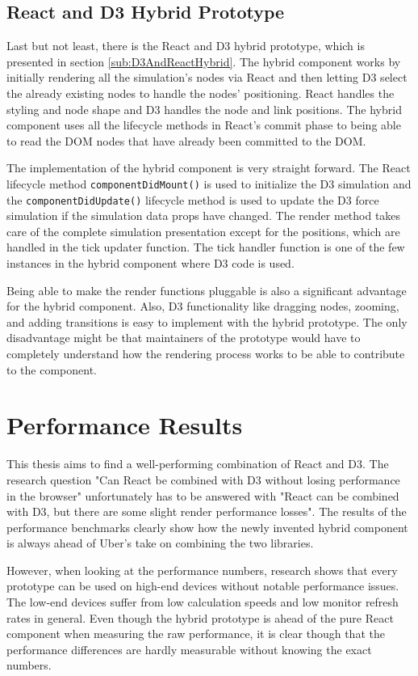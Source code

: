 \subsection{React and D3 Hybrid Prototype}

Last but not least, there is the React and D3 hybrid prototype, which is presented in section \ref{sub:D3AndReactHybrid}. The hybrid component works by initially rendering all the simulation's nodes via React and then letting D3 select the already existing nodes to handle the nodes' positioning. React handles the styling and node shape and D3 handles the node and link positions. The hybrid component uses all the lifecycle methods in React's commit phase to being able to read the DOM nodes that have already been committed to the DOM. 

The implementation of the hybrid component is very straight forward. The React lifecycle method \texttt{componentDidMount()} is used to initialize the D3 simulation and the \texttt{componentDidUpdate()} lifecycle method is used to update the D3 force simulation if the simulation data props have changed. The render method takes care of the complete simulation presentation except for the positions, which are handled in the tick updater function. The tick handler function is one of the few instances in the hybrid component where D3 code is used.

Being able to make the render functions pluggable is also a significant advantage for the hybrid component. Also, D3 functionality like dragging nodes, zooming, and adding transitions is easy to implement with the hybrid prototype. The only disadvantage might be that maintainers of the prototype would have to completely understand how the rendering process works to be able to contribute to the component.

\section{Performance Results}

This thesis aims to find a well-performing combination of React and D3. The research question "Can React be combined with D3 without losing performance in the browser" unfortunately has to be answered with "React can be combined with D3, but there are some slight render performance losses". The results of the performance benchmarks clearly show how the newly invented hybrid component is always ahead of Uber's take on combining the two libraries. 

However, when looking at the performance numbers, research shows that every prototype can be used on high-end devices without notable performance issues. The low-end devices suffer from low calculation speeds and low monitor refresh rates in general. Even though the hybrid prototype is ahead of the pure React component when measuring the raw performance, it is clear though that the performance differences are hardly measurable without knowing the exact numbers.

